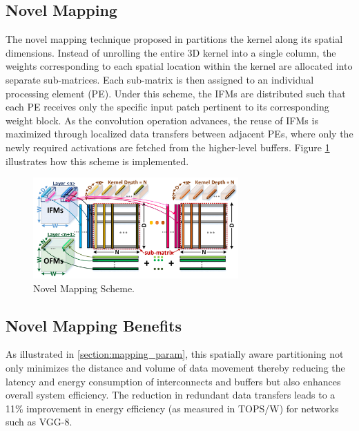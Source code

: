 \documentclass[11pt]{article}
\begin{document}
\subsection{Novel Mapping}
The novel mapping technique proposed in \cite{peng2019optimizing} partitions the kernel along its spatial dimensions. Instead of unrolling the entire 3D kernel into a single column, the weights corresponding to each spatial location within the kernel are allocated into separate sub-matrices. Each sub-matrix is then assigned to an individual processing element (PE). Under this scheme, the IFMs are distributed such that each PE receives only the specific input patch pertinent to its corresponding weight block. As the convolution operation advances, the reuse of IFMs is maximized through localized data transfers between adjacent PEs, where only the newly required activations are fetched from the higher-level buffers. Figure \ref{fig:novel_mapping} illustrates how this scheme is implemented.

\begin{figure}[H]
  \centering
  \includegraphics[width=0.7\textwidth]{asset/novel_map.png} %
  \caption{Novel Mapping Scheme.}
  \label{fig:novel_mapping}
\end{figure}

\subsection{Novel Mapping Benefits}
As illustrated in \ref{section:mapping_param}, this spatially aware partitioning not only minimizes the distance and volume of data movement thereby reducing the latency and energy consumption of interconnects and buffers but also enhances overall system efficiency. The reduction in redundant data transfers leads to a 11\% improvement in energy efficiency (as measured in TOPS/W) for networks such as VGG-8.
\end{document}
